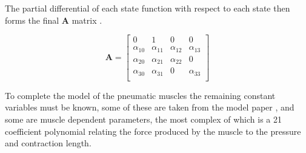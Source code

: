 \documentclass[11pt,a4paper]{article}
\begin{document}
The partial differential of each state function with respect to each state then forms the final $\boldsymbol{A}$ matrix .

\begin{equation}
    \boldsymbol{A} =
    \begin{bmatrix}
    0 & 1 & 0 & 0\\
    \alpha_{10} & \alpha_{11} & \alpha_{12} & \alpha_{13}\\
    \alpha_{20} & \alpha_{21} & \alpha_{22} & 0\\
    \alpha_{30} & \alpha_{31} & 0 & \alpha_{33}\\
    \end{bmatrix}
    \label{math:A_matrix}
\end{equation}

To complete the model of the pneumatic muscles the remaining constant variables must be known, some of these are taken from the model paper \cite{hosovsky_2012}, and some are muscle dependent parameters, the most complex of which is a 21 coefficient polynomial relating the force produced by the muscle to the pressure and contraction length.



\end{document}
